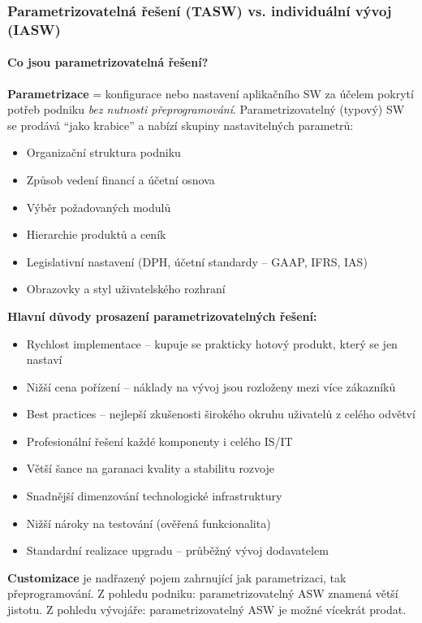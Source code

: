 \subsubsection{Parametrizovatelná řešení (TASW) vs. individuální vývoj (IASW)}

\paragraph{Co jsou parametrizovatelná řešení?}
\textbf{Parametrizace} = konfigurace nebo nastavení aplikačního SW za účelem pokrytí potřeb podniku
\emph{bez nutnosti přeprogramování}. Parametrizovatelný (typový) SW se prodává ``jako krabice'' a
nabízí skupiny nastavitelných parametrů:

\begin{itemize}
  \item Organizační struktura podniku
  \item Způsob vedení financí a účetní osnova
  \item Výběr požadovaných modulů
  \item Hierarchie produktů a ceník
  \item Legislativní nastavení (DPH, účetní standardy -- GAAP, IFRS, IAS)
  \item Obrazovky a styl uživatelského rozhraní
\end{itemize}

\textbf{Hlavní důvody prosazení parametrizovatelných řešení:}
\begin{itemize}
  \item Rychlost implementace -- kupuje se prakticky hotový produkt, který se jen nastaví
  \item Nižší cena pořízení -- náklady na vývoj jsou rozloženy mezi více zákazníků
  \item Best practices -- nejlepší zkušenosti širokého okruhu uživatelů z celého odvětví
  \item Profesionální řešení každé komponenty i celého IS/IT
  \item Větší šance na garanaci kvality a stabilitu rozvoje
  \item Snadnější dimenzování technologické infrastruktury
  \item Nižší nároky na testování (ověřená funkcionalita)
  \item Standardní realizace upgradu -- průběžný vývoj dodavatelem
\end{itemize}

\textbf{Customizace} je nadřazený pojem zahrnující jak parametrizaci, tak přeprogramování.
Z pohledu podniku: parametrizovatelný ASW znamená větší jistotu.
Z pohledu vývojáře: parametrizovatelný ASW je možné vícekrát prodat.

